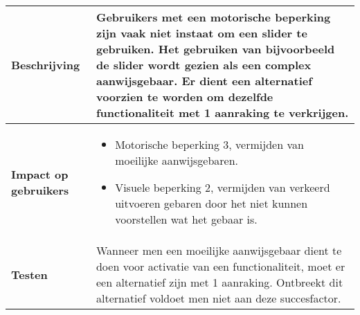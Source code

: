 \begin{table}[H]
\begin{tabular}{|l|p{12cm}|}
        \hline
        \textbf{Beschrijving}                 & Gebruikers met een motorische beperking zijn vaak niet instaat om een slider te gebruiken. Het gebruiken van bijvoorbeeld de slider wordt gezien als een complex aanwijsgebaar. Er dient een alternatief voorzien te worden om dezelfde functionaliteit met 1 aanraking te verkrijgen.\\ 
        \hline
        \textbf{Impact op gebruikers}         &  
        \begin{itemize}
            \item Motorische beperking 3, vermijden van moeilijke aanwijsgebaren.
              \item Visuele beperking 2, vermijden van verkeerd uitvoeren gebaren door het niet kunnen voorstellen wat het gebaar is.
            
        \end{itemize}                                                                                                                                                                                                                                                                                                                                                                                                                    \\ 
       
        \hline
        \textbf{Testen}                       & Wanneer men een moeilijke aanwijsgebaar dient te doen voor activatie van een functionaliteit, moet er een alternatief zijn met 1 aanraking. Ontbreekt dit alternatief voldoet men niet aan deze succesfactor.                                                                                                                        \\
        \hline
    \end{tabular}
    
\end{table}

